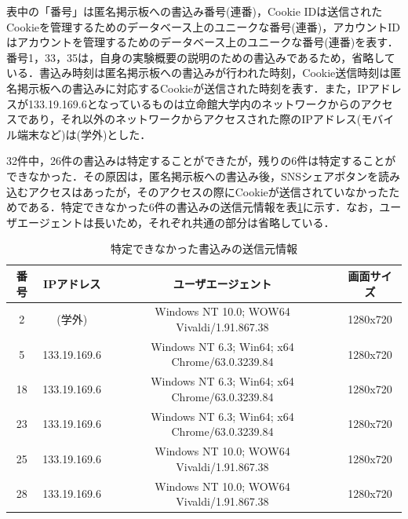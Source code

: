 \documentclass[10pt, a4paper]{jreport}
\begin{document}

表中の「番号」は匿名掲示板への書込み番号(連番)，Cookie IDは送信されたCookieを管理するためのデータベース上のユニークな番号(連番)，アカウントIDはアカウントを管理するためのデータベース上のユニークな番号(連番)を表す．番号1，33，35は，自身の実験概要の説明のための書込みであるため，省略している．書込み時刻は匿名掲示板への書込みが行われた時刻，Cookie送信時刻は匿名掲示板への書込みに対応するCookieが送信された時刻を表す．また，IPアドレスが133.19.169.6となっているものは立命館大学内のネットワークからのアクセスであり，それ以外のネットワークからアクセスされた際のIPアドレス(モバイル端末など)は(学外)とした．

32件中，26件の書込みは特定することができたが，残りの6件は特定することができなかった．その原因は，匿名掲示板への書込み後，SNSシェアボタンを読み込むアクセスはあったが，そのアクセスの際にCookieが送信されていなかったためである．特定できなかった6件の書込みの送信元情報を表\ref{tb: exp_result_untracked}に示す．なお，ユーザエージェントは長いため，それぞれ共通の部分は省略している．

\begin{table}[H]
	\caption{特定できなかった書込みの送信元情報}
	\label{tb: exp_result_untracked}
	\begin{center}
		\scalebox{0.85} {
			\begin{tabular}{ | c | c | c | c | } \hline

番号 & IPアドレス & ユーザエージェント & 画面サイズ \\ \hline
2 & (学外) & Windows NT 10.0; WOW64 Vivaldi/1.91.867.38 & 1280x720 \\ \hline
5 & 133.19.169.6 & Windows NT 6.3; Win64; x64 Chrome/63.0.3239.84 & 1280x720 \\ \hline
18 & 133.19.169.6 & Windows NT 6.3; Win64; x64 Chrome/63.0.3239.84 & 1280x720 \\ \hline
23 & 133.19.169.6 & Windows NT 6.3; Win64; x64 Chrome/63.0.3239.84 & 1280x720 \\ \hline
25 & 133.19.169.6 & Windows NT 10.0; WOW64 Vivaldi/1.91.867.38 & 1280x720 \\ \hline
28 & 133.19.169.6 & Windows NT 10.0; WOW64 Vivaldi/1.91.867.38 & 1280x720 \\ \hline

			\end{tabular}
		}
	\end{center}
\end{table}
\end{document}
